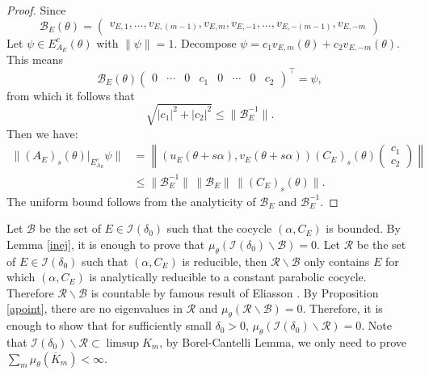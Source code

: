 \documentclass[11pt]{amsart}
\theoremstyle{remark}
\theoremstyle{definition}
\begin{document}
\begin{proof}
  Since $$\mathcal{B}_E(\theta)=\begin{pmatrix}
    v_{E, 1}, \dots, v_{E, (m-1)},v_{E,m},v_{E, -1}, \dots, v_{E, -(m-1)},v_{E,-m}
\end{pmatrix}$$
    Let \( \psi \in E_{A_E}^c(\theta) \) with \( \|\psi\| = 1 \). Decompose \( \psi = c_1 v_{E,m}(\theta) + c_2 v_{E,-m}(\theta) \).  
    This means 
    \[
    \mathcal{B}_E(\theta) \begin{pmatrix} 0 & \cdots & 0 & c_1 & 0 & \cdots & 0 & c_2 \end{pmatrix}^\top = \psi,
    \]
    from which it follows that 
    \[
    \sqrt{|c_1|^2 + |c_2|^2} \leq \|\mathcal{B}_E^{-1}\|.
    \]
    Then we have:
    \[
    \begin{aligned}
        \|(A_E)_s(\theta)|_{E_{A_E}^c} \psi\| 
        &= \left\| \left( u_E(\theta + s\alpha), v_E(\theta + s\alpha) \right) (C_E)_s(\theta) \begin{pmatrix} c_1 \\ c_2 \end{pmatrix} \right\| \\
        &\leq \|\mathcal{B}_E^{-1}\| \, \|\mathcal{B}_E\| \, \|(C_E)_s(\theta)\|.
    \end{aligned}
    \]
    The uniform bound follows from the analyticity of \( \mathcal{B}_E \) and \( \mathcal{B}_E^{-1} \).
\end{proof}


Let $\mathcal{B}$ be the set of $E\in  \mathcal{I}(\delta_0) $ such that the cocycle $(\alpha, C_{E})$ is bounded. 
 By Lemma \ref{inej}, it is enough to prove that
$\mu_{\theta}( \mathcal{I}(\delta_0)\backslash\mathcal{B})=0$.
 Let $\mathcal{R}$ be the set of $E\in  \mathcal{I}(\delta_0) $ such that $( \alpha,C_E)$ is reducible, then $\mathcal{R}\backslash\mathcal{B}$ only contains $E$ for which $(\alpha,C_E)$ is analytically reducible to a constant parabolic cocycle. Therefore $\mathcal{R}\backslash\mathcal{B}$
  is countable by famous result of Eliasson \cite{Eli92}. By Proposition \ref{apoint}, there are no eigenvalues in $\mathcal{R}$ and $\mu_{\theta}(\mathcal{R}\backslash\mathcal{B})=0$.  Therefore, it is enough to show that for sufficiently small $\delta_{0}>0$, 
$\mu_{\theta}( \mathcal{I}(\delta_0)\backslash\mathcal{R})=0.$
Note that $\mathcal{I}(\delta_0)\backslash\mathcal{R}\subset\limsup K_{m}$, by Borel-Cantelli Lemma, we only need to prove $\sum_m \mu_{\theta}(\overline{K}_{m})<\infty$. 
\end{document}
